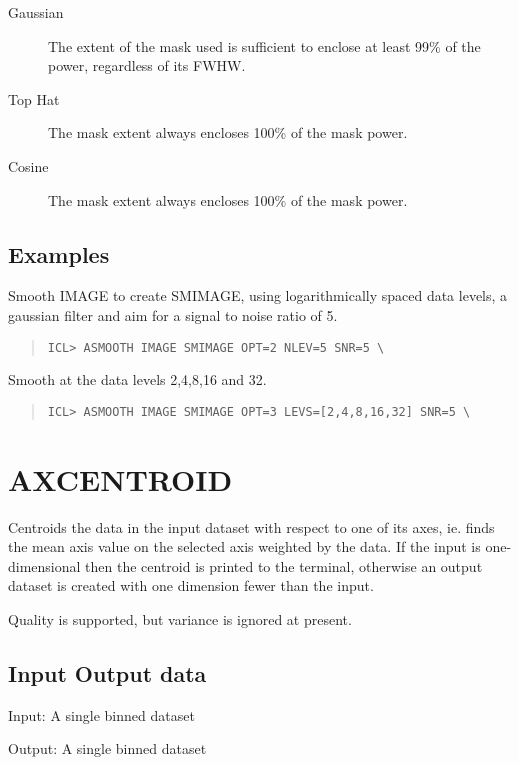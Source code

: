 \documentclass{book}
\renewcommand{\_}{{\tt\char'137}}     %
\begin{document}
\begin{description}
\item[Gaussian]
The extent of the mask used is sufficient
to enclose at least 99\% of the power, regardless of
its FWHW.
\item[Top Hat]
The mask extent always encloses 100\% of
the mask power.
\item[Cosine]
The mask extent always encloses 100\% of
the mask power.
\end{description}
\subsection{Examples}
Smooth IMAGE to create SMIMAGE, using logarithmically spaced
data levels, a gaussian filter and aim for a signal to noise
ratio of 5.

\begin{quote}\begin{verbatim}
ICL> ASMOOTH IMAGE SMIMAGE OPT=2 NLEV=5 SNR=5 \
\end{verbatim}\end{quote}
Smooth at the data levels 2,4,8,16 and 32.

\begin{quote}\begin{verbatim}
ICL> ASMOOTH IMAGE SMIMAGE OPT=3 LEVS=[2,4,8,16,32] SNR=5 \
\end{verbatim}\end{quote}
\section{AXCENTROID}
Centroids the data in the input dataset with respect to one of its
axes, ie. finds the mean axis value on the selected axis weighted by
the data. If the input is one-dimensional then the centroid is printed
to the terminal, otherwise an output dataset is created with one
dimension fewer than the input.

Quality is supported, but variance is ignored at present.

\subsection{Input Output data}
Input: A single binned dataset

Output: A single binned dataset
\end{document}
